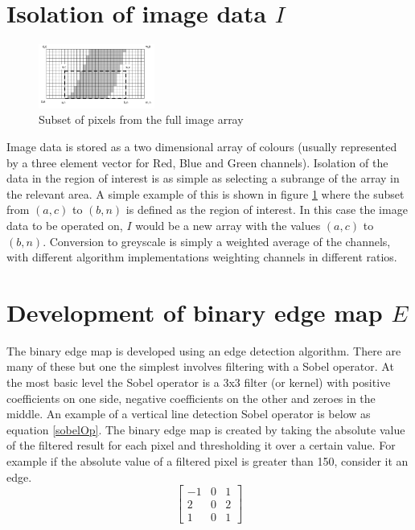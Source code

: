\documentclass{article}
\begin{document}
	\section{Isolation of image data \textit{$I$}}
	\setlength{\intextsep}{0pt}%
	\begin{figure}
		\includegraphics[width=0.34\textwidth]{pixelSubset}
		\caption{Subset of pixels from the full image array}
		\label{pixelSubset}
	\end{figure}
	
	Image data is stored as a two dimensional array of colours (usually represented by a three element vector for Red, Blue and Green channels). Isolation of the data in the region of interest is as simple as selecting a subrange of the array in the relevant area. A simple example of this is shown in figure \ref{pixelSubset} where the subset from $(a,c)$ to $(b,n)$ is defined as the region of interest. In this case the image data to be operated on, \textit{$I$} would be a new array with the values $(a,c)$ to $(b,n)$. Conversion to greyscale is simply a weighted average of the channels, with different algorithm implementations weighting channels in different ratios.
		
	
	\section{Development of binary edge map \textit{$E$}}
	
	 The binary edge map is developed using an edge detection algorithm. There are many of these but one the simplest involves filtering with a Sobel operator. At the most basic level the Sobel operator is a 3x3 filter (or kernel) with positive coefficients on one side, negative coefficients on the other and zeroes in the middle. An example of a vertical line detection Sobel operator is below as equation \ref{sobelOp}. The binary edge map is created by taking the absolute value of the filtered result for each pixel and thresholding it over a certain value. For example if the absolute value of a filtered pixel is greater than 150, consider it an edge. \\

	\begin{equation}\label{sobelOp}
		\begin{bmatrix} 
		-1 & 0 & 1 \\ 
		2 & 0 & 2 \\ 
		1 & 0 & 1  
		\end{bmatrix}
	\end{equation}
	 	 
\end{document}
